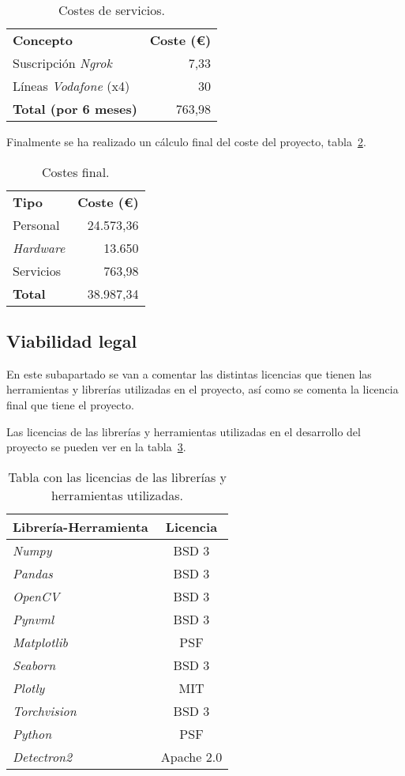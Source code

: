 \begin{table}
	\centering
	\begin{tabular}[]{@{}l r@{}}
		\toprule
		\textbf{Concepto} & \textbf{Coste (\euro{})}\\
		\otoprule
		Suscripción \textit{Ngrok}  & 7,33 \\
		Líneas \textit{Vodafone} (x4) & 30 \\\hubu
		\textbf{Total (por 6 meses)} & 763,98\\
		\bottomrule
	\end{tabular}
	\caption{Costes de servicios.}
	\label{tab:costes_servicios}
\end{table}

Finalmente se ha realizado un cálculo final del coste del proyecto, tabla~\ref{tab:coste_final}.

\begin{table}
	\centering
	\begin{tabular}[]{@{}l r@{}}
		\toprule
		\textbf{Tipo} & \textbf{Coste (\euro{})}\\
		\otoprule
		Personal  & 24.573,36 \\
		\textit{Hardware}& 13.650 \\
		Servicios & 763,98\\\hubu
		\textbf{Total}&38.987,34\\
		\bottomrule
	\end{tabular}
	\caption{Costes final.}
	\label{tab:coste_final}
\end{table}

\subsection{Viabilidad legal}
En este subapartado se van a comentar las distintas licencias que tienen las herramientas y librerías utilizadas en el proyecto, así como se comenta la licencia final que tiene el proyecto.

Las licencias de las librerías y herramientas utilizadas en el desarrollo del proyecto se pueden ver en la tabla~\ref{tab:lic}.

\begin{table}[h]
	\centering
		\begin{tabular}{lc}
			\toprule
			\textbf{Librería-Herramienta}&\textbf{Licencia}\\
			\midrule
			\textit{Numpy} & BSD 3\\
			\textit{Pandas} & BSD 3\\
			\textit{OpenCV}& BSD 3\\
			\textit{Pynvml} & BSD 3\\
			\textit{Matplotlib} &  PSF\\
			\textit{Seaborn} & BSD 3\\
			\textit{Plotly} & MIT\\
			\textit{Torchvision} & BSD 3\\
			\textit{Python} & PSF\\
			\textit{Detectron2}& Apache 2.0\\
			\bottomrule
		\end{tabular}
	\caption{Tabla con las licencias de las librerías y herramientas utilizadas.}
	\label{tab:lic}
\end{table}

